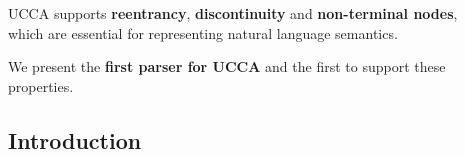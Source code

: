 \documentclass[a0,portrait]{a0poster}
\begin{document}

\begin{adjustbox}{margin=3mm,frame,minipage=.6\linewidth,center}
\Large\color{Navy}
  UCCA supports \textbf{reentrancy}, \textbf{discontinuity} and \textbf{non-terminal nodes},\\
  which are essential for representing natural language semantics.
  
  We present the \textbf{first parser for UCCA} and the first to support these properties.
\end{adjustbox}


\begin{multicols}{2} %


\color{Black} %

\section*{Introduction}

\setlength{\columnsep}{1cm}

\begin{table}
  \vspace{-2cm}
  \begin{adjustbox}{margin=2mm,frame}
  \end{adjustbox}
\end{table}


\end{multicols}
\end{document}
